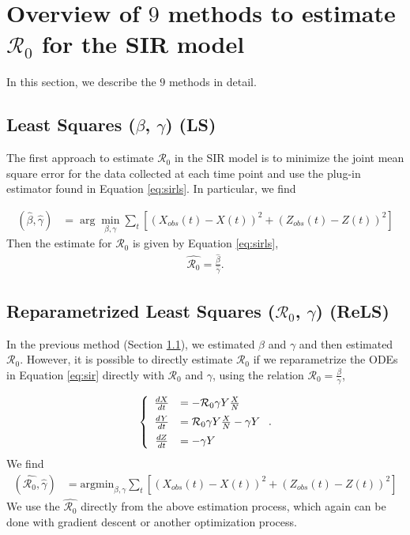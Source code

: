 \documentclass[12pt]{article}
\newcommand{\xxsir}{\ensuremath{9}} %
\newcommand{\rr}{\ensuremath{\mathcal{R}_0}}
\begin{document}
\section{Overview of $\xxsir$ methods to estimate $\rr$ for the SIR model}
\label{sec:methods}

In this section, we describe the $\xxsir$ methods in detail.  

\subsection{Least Squares ($\beta$, $\gamma$) (LS)}\label{least-squares-beta-gamma}
The first approach to estimate $\rr$ in the SIR model is to minimize the joint mean square error for the data collected at each time point and use the plug-in estimator found in Equation \ref{eq:sirls}.  In particular, we find

\begin{align*}
(\hat{\beta}, \hat{\gamma} )&=\arg \min_{\beta, \gamma} \sum_{t} \left [ \left (X_{obs}(t) - X(t)\right )^2 + \left ( Z_{obs}(t) - Z(t) \right )^2 \right ]
\end{align*}
Then  the estimate for $\rr$ is given by Equation \ref{eq:sirls},
\begin{align}\label{eq:sirls}
  \hat{\rr}= \frac{\hat{\beta}}{\hat{\gamma}}.
  \end{align}


\subsection{Reparametrized Least Squares ($\rr$, $\gamma$) (ReLS)}\label{reparametrized-least-squares-rux5f0-gamma}

In the previous method (Section \ref{least-squares-beta-gamma}), we estimated $\beta$ and $\gamma$ and then estimated $\rr$.  However, it is possible to directly estimate $\rr$ if we reparametrize the ODEs in Equation \eqref{eq:sir} directly with \(\rr\) and \(\gamma\), using the relation $\rr = \frac{\beta}{\gamma}$,

\begin{align*}
  \left \{
  \begin{array}{cl}
    \frac{dX}{dt} &= - \rr \gamma Y \frac{X}{N}\vspace{.5em}\\
    \frac{dY}{dt} &=  \rr \gamma Y \frac{X}{N}  - \gamma Y\vspace{.5em} \\
    \frac{dZ}{dt} &=  - \gamma Y 
  \end{array}
  \right . .
  \end{align*}
We find
\begin{align*}
(\hat{\rr}, \hat{\gamma} ) &= \text{argmin}_{\beta, \gamma} \sum_{t} \left [ \left (X_{obs}(t) - X(t)\right )^2 + \left ( Z_{obs}(t) - Z(t) \right )^2 \right ]
\end{align*}
We use the $\hat{\rr}$ directly from the above estimation process, which again can be done with gradient descent or another optimization process.
\end{document}
